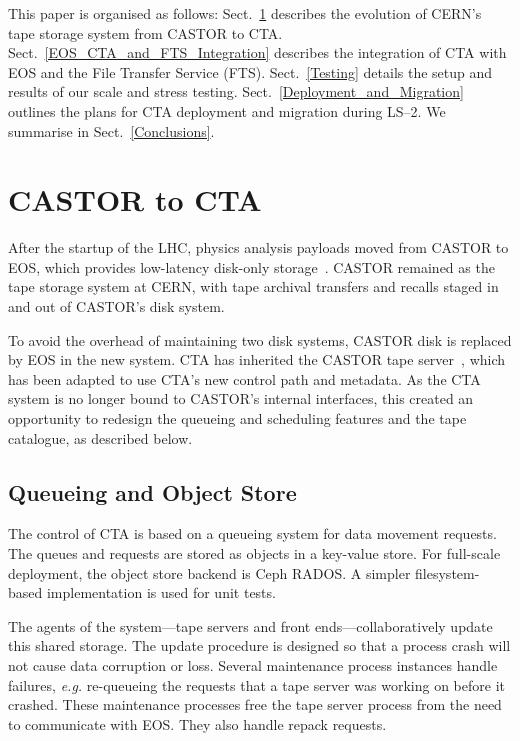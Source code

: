 \documentclass{webofc}
\begin{document}
This paper is organised as follows:
Sect.~\ref{CASTOR_to_CTA} describes the evolution of CERN's tape storage system from CASTOR to CTA.
Sect.~\ref{EOS_CTA_and_FTS_Integration} describes the integration of CTA with EOS and the File Transfer Service (FTS).
Sect.~\ref{Testing} details the setup and results of our scale and stress testing.
Sect.~\ref{Deployment_and_Migration} outlines the plans for CTA deployment and migration during LS--2.
We summarise in Sect.~\ref{Conclusions}.

\section{CASTOR to CTA}
\label{CASTOR_to_CTA}

After the startup of the LHC, physics analysis payloads moved from CASTOR to EOS, which provides low-latency
disk-only storage~\cite{CERN_data_chep2016}. CASTOR remained as the tape storage system at CERN, with
tape archival transfers and recalls staged in and out of CASTOR's disk system.

To avoid the overhead of maintaining two disk systems, CASTOR disk is replaced by EOS in the new
system. CTA has inherited the CASTOR tape server~\cite{tapeserver_chep2015}, which has been adapted to use
CTA's new control path and metadata. As the CTA system is no longer bound to CASTOR's internal interfaces,
this created an opportunity to redesign the queueing and scheduling features and the tape catalogue, as described below.

\subsection{Queueing and Object Store}
The control of CTA is based on a queueing system for data movement requests. The queues and requests
are stored as objects in a key-value store. For full-scale deployment, the object store backend is Ceph RADOS.
A simpler filesystem-based implementation is used for unit tests.

The agents of the system---tape servers and front ends---collaboratively update this shared storage.
The update procedure is designed so that a process crash will not cause data corruption or loss.
Several maintenance process instances handle failures, \textit{e.g.} re-queueing the requests
that a tape server was working on before it crashed. These maintenance processes free the tape server process
from the need to communicate with EOS. They also handle repack requests.
\end{document}
